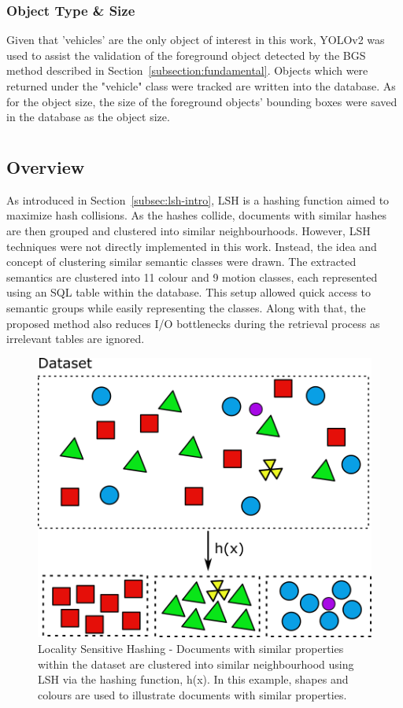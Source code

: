 \subsubsection{Object Type \& Size}
\label{objecttype}
Given that 'vehicles' are the only object of interest in this work, YOLOv2 was used to assist the validation of the foreground object detected by the BGS method described in Section~\ref{subsection:fundamental}. Objects which were returned under the "vehicle" class were tracked are written into the database. As for the object size, the size of the foreground objects' bounding boxes were saved in the database as the object size.


\section{\versionOneExt }
\label{section:semantic_lsh}

\subsection{Overview}
As introduced in Section~\ref{subsec:lsh-intro}, LSH is a hashing function aimed to maximize hash collisions.
As the hashes collide, documents with similar hashes are then grouped and clustered into similar neighbourhoods.
However, LSH techniques were not directly implemented in this work. Instead, the idea and concept of clustering similar semantic classes were drawn.
The extracted semantics are clustered into 11 colour and 9 motion classes, each represented using an SQL table within the database.
This setup allowed quick access to semantic groups while easily representing the classes. Along with that, the proposed method also reduces I/O bottlenecks during the retrieval process as irrelevant tables are ignored.


\begin{figure}[hbt!]\centering
\includegraphics[width=.7\textwidth]{image/new/lsh.png}
\caption{Locality Sensitive Hashing - Documents with similar properties within the dataset are clustered into similar neighbourhood using LSH via the hashing function, h(x). In this example, shapes and colours are used to illustrate documents with similar properties.}
\label{fig:lshexample}
\end{figure}

